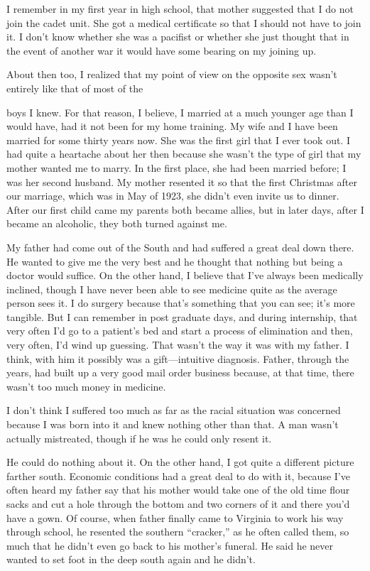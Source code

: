 \begin{biblechapter}
I remember in my first year in high school, that mother suggested that I do not join the cadet unit. She got a medical certificate so that I should not have to join it. I don’t know whether she was a pacifist or whether she just thought that in the event of another war it would have some bearing on my joining up.

About then too, I realized that my point of view on the opposite sex wasn’t entirely like that of most of the

boys I knew. For that reason, I believe, I married at a much younger age than I would have, had it not been for my home training. My wife and I have been married for some thirty years now. She was the first girl that I ever took out. I had quite a heartache about her then because she wasn’t the type of girl that my mother wanted me to marry. In the first place, she had been married before; I was her second husband. My mother resented it so that the first Christmas after our marriage, which was in May of 1923, she didn’t even invite us to dinner. After our first child came my parents both became allies, but in later days, after I became an alcoholic, they both turned against me.

My father had come out of the South and had suffered a great deal down there. He wanted to give me the very best and he thought that nothing but being a doctor would suffice. On the other hand, I believe that I’ve always been medically inclined, though I have never been able to see medicine quite as the average person sees it. I do surgery because that’s something that you can see; it’s more tangible. But I can remember in post graduate days, and during internship, that very often I’d go to a patient’s bed and start a process of elimination and then, very often, I’d wind up guessing. That wasn’t the way it was with my father. I think, with him it possibly was a gift—intuitive diagnosis. Father, through the years, had built up a very good mail order business because, at that time, there wasn’t too much money in medicine.

I don’t think I suffered too much as far as the racial situation was concerned because I was born into it and knew nothing other than that. A man wasn’t actually mistreated, though if he was he could only resent it.

He could do nothing about it. On the other hand, I got quite a different picture farther south. Economic conditions had a great deal to do with it, because I’ve often heard my father say that his mother would take one of the old time flour sacks and cut a hole through the bottom and two corners of it and there you’d have a gown. Of course, when father finally came to Virginia to work his way through school, he resented the southern “cracker,” as he often called them, so much that he didn’t even go back to his mother’s funeral. He said he never wanted to set foot in the deep south again and he didn’t.


\end{biblechapter}
